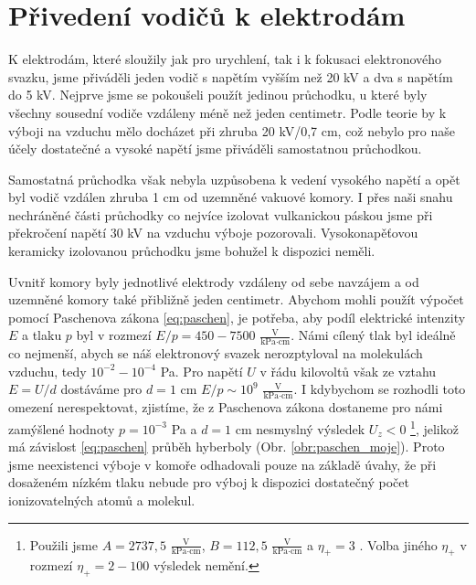 \section{Přivedení vodičů k elektrodám}
\par K elektrodám, které sloužily jak pro urychlení, tak i k fokusaci elektronového svazku, jsme přiváděli jeden vodič s napětím vyšším než 20 kV a dva s napětím do 5 kV. Nejprve jsme se pokoušeli použít jedinou průchodku, u které byly všechny sousední vodiče vzdáleny méně než jeden centimetr. Podle teorie by k výboji na vzduchu mělo docházet při zhruba 20 kV/0,7 cm, což nebylo pro naše účely dostatečné a vysoké napětí jsme přiváděli samostatnou průchodkou.
\par Samostatná průchodka však nebyla uzpůsobena k vedení vysokého napětí a opět byl vodič vzdálen zhruba 1 cm od uzemněné vakuové komory. I přes naši snahu nechráněné části průchodky co nejvíce izolovat vulkanickou páskou jsme při překročení napětí 30 kV na vzduchu výboje pozorovali. Vysokonapěťovou keramicky izolovanou průchodku jsme bohužel k dispozici neměli.
\par Uvnitř komory byly jednotlivé elektrody vzdáleny od sebe navzájem a od uzemněné komory také přibližně jeden centimetr. Abychom mohli použít výpočet pomocí Paschenova zákona \eqref{eq:paschen}, je potřeba, aby podíl elektrické intenzity $E$ a tlaku $p$ byl v rozmezí $E/p=450-7500$ $\frac{\text{V}}{\text{kPa} \cdot \text{cm}}$. Námi cílený tlak byl ideálně co nejmenší, abych se náš elektronový svazek nerozptyloval na molekulách vzduchu, tedy $10^{-2}-10^{-4}$ Pa. Pro napětí $U$ v řádu kilovoltů však ze vztahu $E=U/d$ dostáváme pro $d=1$ cm $E/p \sim 10^{9}$ $\frac{\text{V}}{\text{kPa} \cdot \text{cm}}$. I kdybychom se rozhodli toto omezení nerespektovat, zjistíme, že z Paschenova zákona dostaneme pro námi zamýšlené hodnoty $p=10^{-3}$ Pa a $d=1$ cm nesmyslný výsledek $U_z<0$ \footnote{Použili jsme $A=2737,5$ $\frac{\text{V}}{\text{kPa} \cdot \text{cm}}$, $B=112,5$ $\frac{\text{V}}{\text{kPa} \cdot \text{cm}}$ a $\eta_+=3$ \cite{Bozhko}. Volba jiného $\eta_+$ v rozmezí $\eta_+=2-100$ výsledek nemění.}, jelikož má závislost \eqref{eq:paschen} průběh hyberboly (Obr. \ref{obr:paschen_moje}).
Proto jsme neexistenci výboje v komoře odhadovali pouze na základě úvahy, že při dosaženém nízkém tlaku nebude pro výboj k dispozici dostatečný počet ionizovatelných atomů a molekul.



